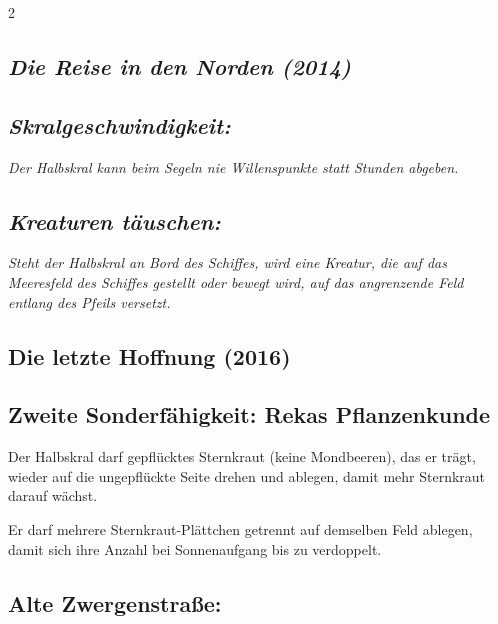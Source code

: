 \documentclass[10pt, a4paper, oneside]{book}
\newcommand{\fan}[1]{\textit{#1}}
\begin{document}
\begin{multicols*}{2}
\begin{nobgcolor}
\end{nobgcolor}



\columnbreak


\begin{bgcolor}
\section{\fan{Die Reise in den Norden (2014)}}


\subsection{\fan{Skralgeschwindigkeit:}}

\fan{Der Halbskral kann beim Segeln nie Willenspunkte statt Stunden abgeben.}


\subsection{\fan{Kreaturen täuschen:}}

\fan{Steht der Halbskral an Bord des Schiffes, wird eine Kreatur, die auf das Meeresfeld des Schiffes gestellt oder bewegt wird, auf das angrenzende Feld entlang des Pfeils versetzt.}


\end{bgcolor}




\begin{bgcolor}
\section{Die letzte Hoffnung (2016)}

\subsection{Zweite Sonderfähigkeit: Rekas Pflanzenkunde}

Der Halbskral darf gepflücktes Sternkraut (keine Mondbeeren\supercite{MH:Mondbeeren,MH:Begleitheft}), das er trägt, wieder auf die ungepflückte Seite drehen und ablegen, damit mehr Sternkraut darauf wächst.
\supercite{DH11:Heldenkarte_Halbskral}

Er darf mehrere Sternkraut-Plättchen getrennt auf demselben Feld ablegen, damit sich ihre Anzahl bei Sonnenaufgang bis zu verdoppelt.
\supercite{DH:FAQ,DH:Begleitheft}

 


\subsection{Alte Zwergenstraße:}


\end{bgcolor}
\end{multicols*}
\end{document}
